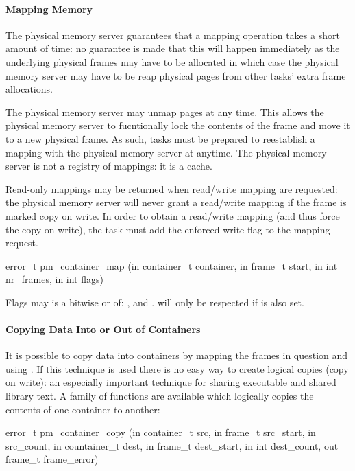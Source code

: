 \paragraph{Mapping Memory}

The physical memory server guarantees that a mapping operation takes a
short amount of time: no guarantee is made that this will happen
immediately as the underlying physical frames may have to be allocated
in which case the physical memory server may have to be reap physical
pages from other tasks' extra frame allocations.

The physical memory server may unmap pages at any time.  This allows
the physical memory server to fucntionally lock the contents of the
frame and move it to a new physical frame.  As such, tasks must be
prepared to reestablish a mapping with the physical memory server at
anytime.  The physical memory server is not a registry of mappings: it
is a cache.

Read-only mappings may be returned when read/write mapping are
requested: the physical memory server will never grant a read/write
mapping if the frame is marked copy on write.  In order to obtain a
read/write mapping (and thus force the copy on write), the task must
add the enforced write flag to the mapping request.

\begin{code}
error\_t pm\_container\_map (in container\_t container, in frame\_t
start, in int nr\_frames, in int flags)
\end{code}

\noindent
Flags may is a bitwise or of: ,
 and .
 will only be respected if
 is also set.

\paragraph{Copying Data Into or Out of Containers}

It is possible to copy data into containers by mapping the frames in
question and using .  If this technique is used there
is no easy way to create logical copies (copy on write): an especially
important technique for sharing executable and shared library text.  A
family of functions are available which logically copies the contents
of one container to another:

\begin{code}
error\_t pm\_container\_copy (in container\_t src, in frame\_t
src\_start, in src\_count, in countainer\_t dest, in frame\_t
dest\_start, in int dest\_count, out frame\_t frame\_error)
\end{code}

